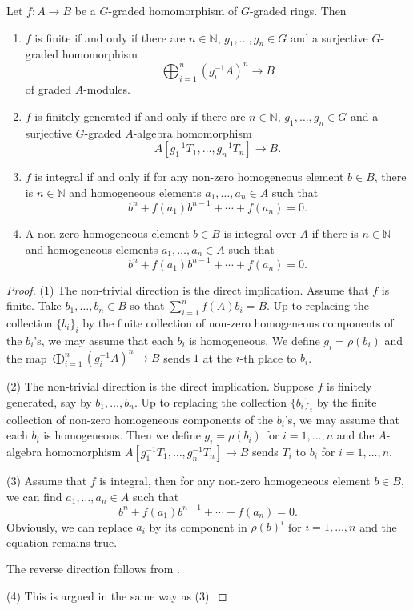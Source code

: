 \begin{proposition}\label{prop-gradedfiniteintegral}
    Let $f:A\rightarrow B$ be a $G$-graded homomorphism of $G$-graded rings. Then 
    \begin{enumerate}
        \item $f$ is finite if and only if there are $n\in \mathbb{N}$, $g_1,\ldots,g_n\in G$ and a surjective $G$-graded homomorphism 
        \[
            \bigoplus_{i=1}^n(g_i^{-1}A)^n\rightarrow B
        \] 
        of graded $A$-modules.
        \item $f$ is finitely generated if and only if there are $n\in \mathbb{N}$,  $g_1,\ldots,g_n\in G$ and a surjective $G$-graded $A$-algebra homomorphism
        \[
            A[g_1^{-1}T_1,\ldots,g_{n}^{-1}T_n]\rightarrow B.  
        \] 
        \item $f$ is integral if and only if for any non-zero homogeneous element $b\in B$, there is $n\in \mathbb{N}$ and homogeneous elements $a_1,\ldots,a_n\in A$ such that
        \[
            b^n+f(a_1)b^{n-1}+\cdots+f(a_n)=0.  
        \]
        \item A non-zero homogeneous element $b\in B$ is integral over $A$ if there is $n\in \mathbb{N}$ and homogeneous elements $a_1,\ldots,a_n\in A$ such that
        \[
            b^n+f(a_1)b^{n-1}+\cdots+f(a_n)=0.  
        \]
    \end{enumerate}
\end{proposition}
\begin{proof}
    (1) The non-trivial direction is the direct implication. Assume that $f$ is finite. Take $b_1,\ldots,b_n\in B$ so that $\sum_{i=1}^nf(A)b_i=B$. Up to replacing the collection $\{b_i\}_i$ by the finite collection of non-zero homogeneous components of the $b_i$'s, we may assume that each $b_i$ is homogeneous. We define $g_i=\rho(b_i)$ and the map $\bigoplus_{i=1}^n(g_i^{-1}A)^n\rightarrow B$ sends $1$ at the $i$-th place to $b_i$. 

    (2) The non-trivial direction is the direct implication. Suppose $f$ is finitely generated, say by $b_1,\ldots,b_n$. Up to replacing the collection $\{b_i\}_i$ by the finite collection of non-zero homogeneous components of the $b_i$'s, we may assume that each $b_i$ is homogeneous. Then we define $g_i=\rho(b_i)$ for $i=1,\ldots,n$ and the $A$-algebra homomorphism $A[g_1^{-1}T_1,\ldots,g_{n}^{-1}T_n]\rightarrow B$ sends $T_i$ to $b_i$ for $i=1,\ldots,n$.

    (3) Assume that $f$ is integral, then for any non-zero homogeneous element $b\in B$, we can find $a_1,\ldots,a_n\in A$ such that 
    \[
        b^n+f(a_1)b^{n-1}+\cdots+f(a_n)=0.  
    \]
    Obviously, we can replace $a_i$ by its component in $\rho(b)^i$ for $i=1,\ldots,n$ and the equation remains true.

    The reverse direction follows from \cite[\href{https://stacks.math.columbia.edu/tag/00GO}{Tag 00GO}]{stacks-project}.

    (4) This is argued in the same way as (3).
\end{proof}

